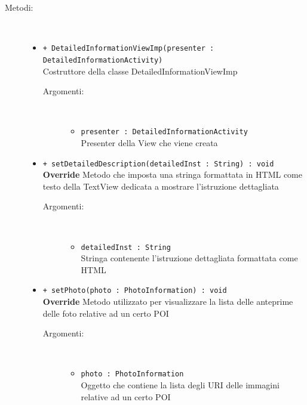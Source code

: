 \documentclass[../DefinizioneDiProdotto.tex]{subfiles}
\begin{document}
\begin{description}
\begin{itemize}
	\end{itemize}
	\item[Metodi:] \
	\begin{itemize}
		\item \texttt{+ DetailedInformationViewImp(presenter :\\ DetailedInformationActivity)}\\
		Costruttore della classe DetailedInformationViewImp
		\begin{description}
			\item[Argomenti:] \
			\begin{itemize}
				\item \texttt{presenter : DetailedInformationActivity}\\
				Presenter della View che viene creata\end{itemize}
		\end{description}
		\item \texttt{+ setDetailedDescription(detailedInst : String) : void}\\
		\textbf{Override} Metodo che imposta una stringa formattata in HTML come testo della TextView dedicata a mostrare l'istruzione dettagliata
		\begin{description}
			\item[Argomenti:] \
			\begin{itemize}
				\item \texttt{detailedInst : String}\\
				Stringa contenente l'istruzione dettagliata formattata come HTML\end{itemize}
		\end{description}
		\item \texttt{+ setPhoto(photo : PhotoInformation) : void}\\
		\textbf{Override} Metodo utilizzato per visualizzare la lista delle anteprime delle foto relative ad un certo POI
		\begin{description}
			\item[Argomenti:] \
			\begin{itemize}
				\item \texttt{photo : PhotoInformation}\\
				Oggetto che contiene la lista degli URI delle immagini relative ad un certo POI\end{itemize}
		\end{description}
	\end{itemize}
\end{description}
\end{document}
